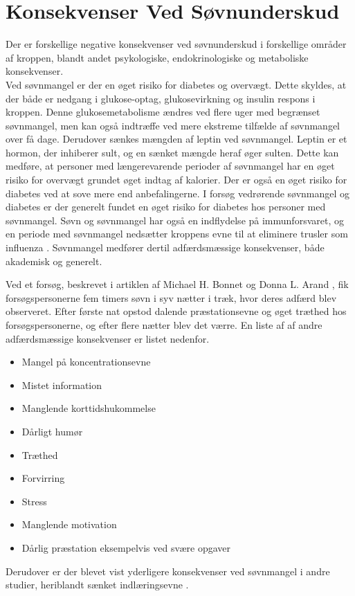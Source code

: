 \section{Konsekvenser Ved Søvnunderskud}
\label{sec:konsekvenser}

Der er forskellige negative konsekvenser ved søvnunderskud i forskellige områder af kroppen, blandt andet psykologiske, endokrinologiske og metaboliske konsekvenser. 
\\
Ved søvnmangel er der en øget risiko for diabetes og overvægt. Dette skyldes, at der både er nedgang i glukose-optag, glukosevirkning og insulin respons i kroppen. Denne glukosemetabolisme ændres ved flere uger med begrænset søvnmangel, men kan også indtræffe ved mere ekstreme tilfælde af søvnmangel over få dage. Derudover sænkes mængden af leptin ved søvnmangel. Leptin er et hormon, der inhiberer sult, og en sænket mængde heraf øger sulten. Dette kan medføre, at personer med længerevarende perioder af søvnmangel har en øget risiko for overvægt grundet øget indtag af kalorier. Der er også en øget risiko for diabetes ved at sove mere end anbefalingerne. \cite{Knutson2007, Chaput2007} I forsøg vedrørende søvnmangel og diabetes er der generelt fundet en øget risiko for diabetes hos personer med søvnmangel\cite{AlDabal2011}.
Søvn og søvnmangel har også en indflydelse på immunforsvaret, og en periode med søvnmangel nedsætter kroppens evne til at eliminere trusler som influenza \cite{Spiegel2002, Gryglewska2010}.
Søvnmangel medfører dertil adfærdsmæssige konsekvenser, både akademisk og generelt. 


Ved et forsøg, beskrevet i artiklen af Michael H. Bonnet og Donna L. Arand \cite{Bonnet2003}, fik forsøgspersonerne fem timers søvn i syv nætter i træk, hvor deres adfærd blev observeret. Efter første nat opstod dalende præstationsevne og øget træthed hos forsøgspersonerne, og efter flere nætter blev det værre. En liste af af andre adfærdsmæssige konsekvenser er listet nedenfor. 

\begin{itemize}
  \item Mangel på koncentrationsevne
  \item Mistet information
  \item Manglende korttidshukommelse
  \item Dårligt humør
  \item Træthed
  \item Forvirring
  \item Stress
  \item Manglende motivation
  \item Dårlig præstation eksempelvis ved svære opgaver
\end{itemize}

Derudover er der blevet vist yderligere konsekvenser ved søvnmangel i andre studier, heriblandt sænket indlæringsevne \cite[kap. 7]{Sundhedsstyrrelsen2011}.

